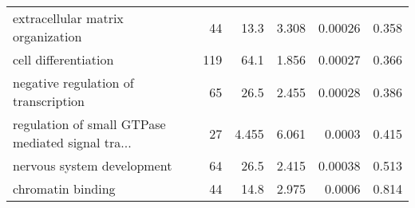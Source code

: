 \begin{longtable}{lrrrrr}
                 extracellular matrix organization &                      44 &                    13.3 &      3.308 &              0.00026 &                0.358 \\
                              cell differentiation &                     119 &                    64.1 &      1.856 &              0.00027 &                0.366 \\
              negative regulation of transcription &                      65 &                    26.5 &      2.455 &              0.00028 &                0.386 \\
 regulation of small GTPase mediated signal tra... &                      27 &                   4.455 &      6.061 &               0.0003 &                0.415 \\
                        nervous system development &                      64 &                    26.5 &      2.415 &              0.00038 &                0.513 \\
                                 chromatin binding &                      44 &                    14.8 &      2.975 &               0.0006 &                0.814 \\
\end{longtable}
